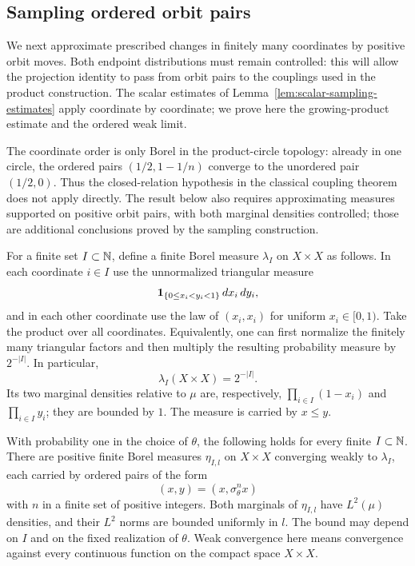 \subsection{Sampling ordered orbit pairs}\label{p:sec:sampling}

We next approximate prescribed changes in finitely many coordinates by
positive orbit moves.  Both endpoint distributions must remain controlled:
this will allow the projection identity to pass from orbit pairs to the
couplings used in the product construction.  The scalar estimates of
Lemma~\ref{lem:scalar-sampling-estimates} apply coordinate by coordinate;
we prove here the growing-product estimate and the ordered weak limit.

The coordinate order is only Borel in the product-circle topology:
already in one circle, the ordered pairs $(1/2,1-1/n)$ converge to
the unordered pair $(1/2,0)$.  Thus the closed-relation hypothesis in
the classical coupling theorem \cite[Corollary~3.2]{Edwards1978} does
not apply directly.  The result below also requires approximating
measures supported on positive orbit pairs, with both marginal densities
controlled; those are additional conclusions proved by the sampling
construction.

For a finite set $I\subset\mathbb N$, define a finite Borel measure
$\lambda_I$ on $X\times X$ as follows.  In each coordinate $i\in I$
use the unnormalized triangular measure
\[
 \mathbf 1_{\{0\le x_i<y_i<1\}}\,dx_i\,dy_i,
\]
and in each other coordinate use the law of $(x_i,x_i)$ for uniform
$x_i\in[0,1)$.  Take the product over all coordinates.  Equivalently,
one can first normalize the finitely many triangular factors and
then multiply the resulting probability measure by $2^{-|I|}$.
In particular,
\[
 \lambda_I(X\times X)=2^{-|I|}.
\]
Its two marginal densities relative to $\mu$ are, respectively,
$\prod_{i\in I}(1-x_i)$ and $\prod_{i\in I}y_i$; they are bounded
by $1$.  The measure is carried by $x\le y$.

\begin{proposition}\label{p:prop:sampling}
With probability one in the choice of $\theta$, the following holds
for every finite $I\subset\mathbb N$.  There are positive finite Borel
measures $\eta_{I,l}$ on $X\times X$ converging weakly to
$\lambda_I$, each carried by ordered pairs of the form
\[
 (x,y)=(x,\sigma_\theta^n x)
\]
with $n$ in a finite set of positive integers.  Both marginals of
$\eta_{I,l}$ have $L^2(\mu)$ densities, and their $L^2$ norms are
bounded uniformly in $l$.  The bound may depend on $I$ and on the
fixed realization of $\theta$.  Weak convergence here means
convergence against every continuous function on the compact space
$X\times X$.
\end{proposition}

